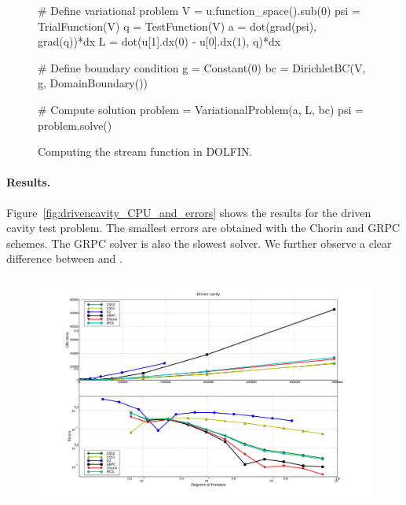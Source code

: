 \begin{figure}
  \begin{center}
    \begin{python}
# Define variational problem
V   = u.function_space().sub(0)
psi = TrialFunction(V)
q   = TestFunction(V)
a   = dot(grad(psi), grad(q))*dx
L   = dot(u[1].dx(0) - u[0].dx(1), q)*dx

# Define boundary condition
g  = Constant(0)
bc = DirichletBC(V, g, DomainBoundary())

# Compute solution
problem = VariationalProblem(a, L, bc)
psi = problem.solve()
    \end{python}
    \caption{Computing the stream function in DOLFIN.}
    \label{fig:streamfunction}
  \end{center}
\end{figure}

\paragraph{Results.}

Figure~\ref{fig:drivencavity_CPU_and_errors} shows the results for the
driven cavity test problem.  The smallest errors are obtained with the
Chorin and GRPC schemes. The GRPC solver is also the slowest
solver. We further observe a clear difference between  and
.

\begin{figure}
          {\includegraphics[width=\textwidth]{chapters/kvs-1/pdf/new_drivencavity_res.pdf}}
\end{figure}

